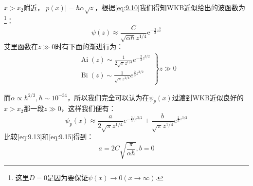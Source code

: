 \documentclass[a4paper,zihao=-4,linespread=1]{ctexrep}
\begin{document}
    $x>x_2$附近，$|p(x)|=\hbar\alpha\sqrt{z}$，根据\ref{eq:9.10}我们得知WKB近似给出的波函数为\footnote{这里$D=0$是因为要保证$\psi(x)\to 0(x\to\infty)$.}：
    \begin{equation}
        \label{eq:9.13}
        \psi(z)\approx\frac{C}{\sqrt{\alpha\hbar}z^{1/4}}\mathrm{e}^{-\frac{2}{3}z^{\frac{3}{2}}}
    \end{equation}
    艾里函数在$z\gg 0$时有下面的渐进行为：
    \begin{eqnarray}
        \left.\begin{array}{l}
            \operatorname{Ai}(z) \sim \frac{1}{2 \sqrt{\pi} z^{1 / 4}} e^{-\frac{2}{3} z^{3 / 2}} \\
            \operatorname{Bi}(z) \sim \frac{1}{\sqrt{\pi} z^{1 / 4}} e^{\frac{2}{3} z^{3 / 2}}
            \end{array}\right\} z \gg 0
    \end{eqnarray}
    
    而$\alpha\propto\hbar^{2/3},\hbar\sim 10^{-34}$，所以我们完全可以认为在$\psi_p(x)$过渡到WKB近似良好的$x>x_2$那一段$z\gg 0$，这样我们便有：
    \begin{equation}
        \label{eq:9.15}
        \psi_{p}(x) \approx \frac{a}{2 \sqrt{\pi}z^{1 / 4}} e^{-\frac{2}{3}(z^{3 / 2}}+\frac{b}{\sqrt{\pi}z^{1 / 4}} e^{\frac{2}{3}z^{3 / 2}}
    \end{equation}
    比较\ref{eq:9.13}和\ref{eq:9.15}得到：
    \[a=2C\sqrt{\frac{\pi}{\alpha\hbar}},b=0\]
\end{document}
